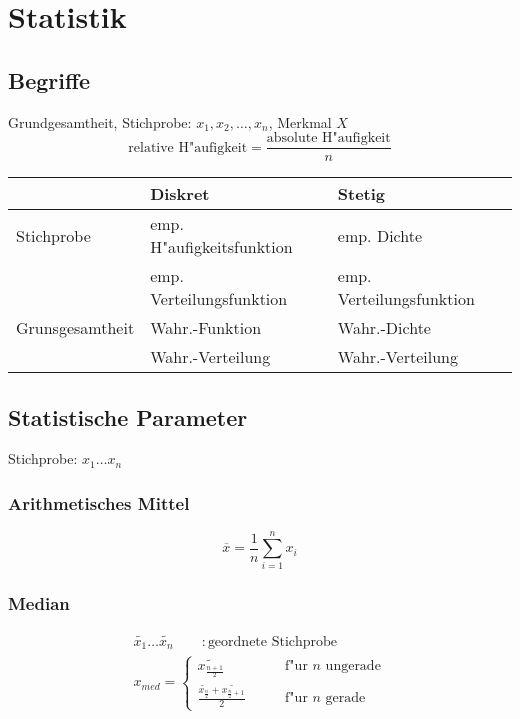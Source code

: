 \section{Statistik}
\subsection{Begriffe}
Grundgesamtheit, Stichprobe: $x_1, x_2, \ldots, x_n$,  Merkmal $X$
\begin{equation*}
	\text{relative H"aufigkeit} = \frac{\text{absolute H"aufigkeit}}{n}
\end{equation*}
\begin{center}\begin{tabular}{|l|l|l|}
	\hline
			& Diskret 			& Stetig \\
	\hline
	Stichprobe	& emp. H"aufigkeitsfunktion	& emp. Dichte \\
			& emp. Verteilungsfunktion	& emp. Verteilungsfunktion \\
	\hline
	Grunsgesamtheit	& Wahr.-Funktion		& Wahr.-Dichte \\
			& Wahr.-Verteilung		& Wahr.-Verteilung \\
	\hline
\end{tabular}\end{center}

\subsection{Statistische Parameter}
Stichprobe: $x_1 \ldots x_n$
\subsubsection{Arithmetisches Mittel}
\begin{equation}
	\overline{x}=\frac{1}{n}\sum_{i=1}^n x_i
\end{equation}

\subsubsection{Median}
\begin{gather}
	\widetilde{x_1}\ldots\widetilde{x_n}\qquad :\text{geordnete Stichprobe} \\
	x_{med} = \begin{cases}
		\widetilde{x_{\frac{n+1}{2}}}\qquad & \text{f"ur $n$ ungerade} \\
		\frac{\widetilde{x_{\frac{n}{2}}}+\widetilde{x_{\frac{n}{2}+1}}}{2}\qquad & \text{f"ur $n$ gerade}
	\end{cases}
\end{gather}

